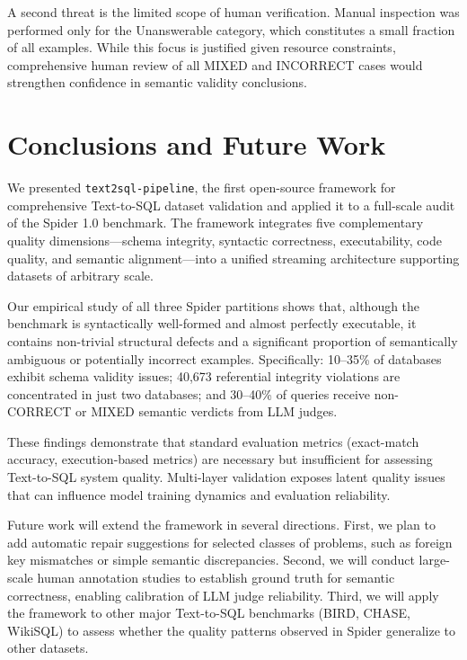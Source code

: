 \documentclass[]{einformatica}
\begin{document}
A second threat is the limited scope of human verification. Manual inspection was performed only for the Unanswerable category, which constitutes a small fraction of all examples. While this focus is justified given resource constraints, comprehensive human review of all MIXED and INCORRECT cases would strengthen confidence in semantic validity conclusions.

\section{Conclusions and Future Work}\label{sec:Conclusions}

We presented \texttt{text2sql-pipeline}, the first open-source framework for comprehensive Text-to-SQL dataset validation and applied it to a full-scale audit of the Spider 1.0 benchmark. The framework integrates five complementary quality dimensions—schema integrity, syntactic correctness, executability, code quality, and semantic alignment—into a unified streaming architecture supporting datasets of arbitrary scale.

Our empirical study of all three Spider partitions shows that, although the benchmark is syntactically well-formed and almost perfectly executable, it contains non-trivial structural defects and a significant proportion of semantically ambiguous or potentially incorrect examples. Specifically: 10--35\% of databases exhibit schema validity issues; 40,673 referential integrity violations are concentrated in just two databases; and 30--40\% of queries receive non-CORRECT or MIXED semantic verdicts from LLM judges.

These findings demonstrate that standard evaluation metrics (exact-match accuracy, execution-based metrics) are necessary but insufficient for assessing Text-to-SQL system quality. Multi-layer validation exposes latent quality issues that can influence model training dynamics and evaluation reliability.

Future work will extend the framework in several directions. First, we plan to add automatic repair suggestions for selected classes of problems, such as foreign key mismatches or simple semantic discrepancies. Second, we will conduct large-scale human annotation studies to establish ground truth for semantic correctness, enabling calibration of LLM judge reliability. Third, we will apply the framework to other major Text-to-SQL benchmarks (BIRD, CHASE, WikiSQL) to assess whether the quality patterns observed in Spider generalize to other datasets.
\end{document}
